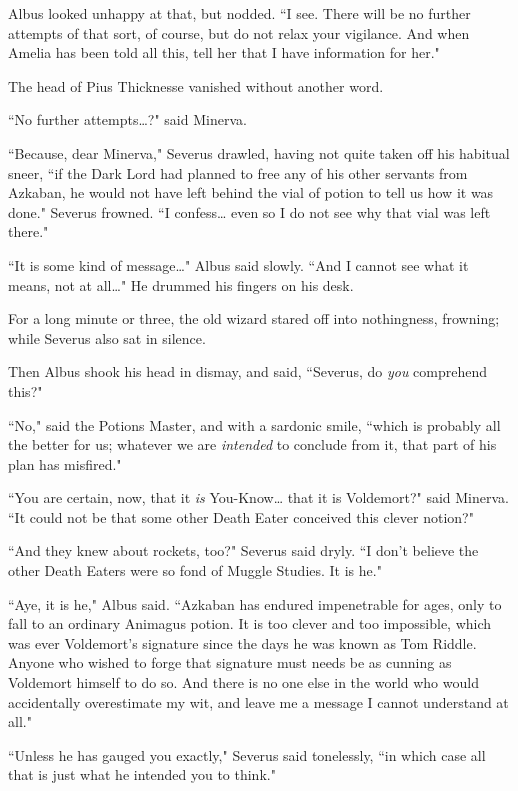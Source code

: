Albus looked unhappy at that, but nodded. ``I see. There will be no further attempts of that sort, of course, but do not relax your vigilance. And when Amelia has been told all this, tell her that I have information for her."

The head of Pius Thicknesse vanished without another word.

``No further attempts{\ldots}?" said Minerva.

``Because, dear Minerva," Severus drawled, having not quite taken off his habitual sneer, ``if the Dark Lord had planned to free any of his other servants from Azkaban, he would not have left behind the vial of potion to tell us how it was done." Severus frowned. ``I confess{\ldots} even so I do not see why that vial was left there."

``It is some kind of message{\ldots}" Albus said slowly. ``And I cannot see what it means, not at all{\ldots}" He drummed his fingers on his desk.

For a long minute or three, the old wizard stared off into nothingness, frowning; while Severus also sat in silence.

Then Albus shook his head in dismay, and said, ``Severus, do \emph{you} comprehend this?"

``No," said the Potions Master, and with a sardonic smile, ``which is probably all the better for us; whatever we are \emph{intended} to conclude from it, that part of his plan has misfired."

``You are certain, now, that it \emph{is} You-Know{\ldots} that it is Voldemort?" said Minerva. ``It could not be that some other Death Eater conceived this clever notion?"

``And they knew about rockets, too?" Severus said dryly. ``I don't believe the other Death Eaters were so fond of Muggle Studies. It is he."

``Aye, it is he," Albus said. ``Azkaban has endured impenetrable for ages, only to fall to an ordinary Animagus potion. It is too clever and too impossible, which was ever Voldemort's signature since the days he was known as Tom Riddle. Anyone who wished to forge that signature must needs %
be as cunning as Voldemort himself to do so. And there is no one else in the world who would accidentally overestimate my wit, and leave me a message I cannot understand at all."

``Unless he has gauged you exactly," Severus said tonelessly, ``in which case all that is just what he intended you to think."

